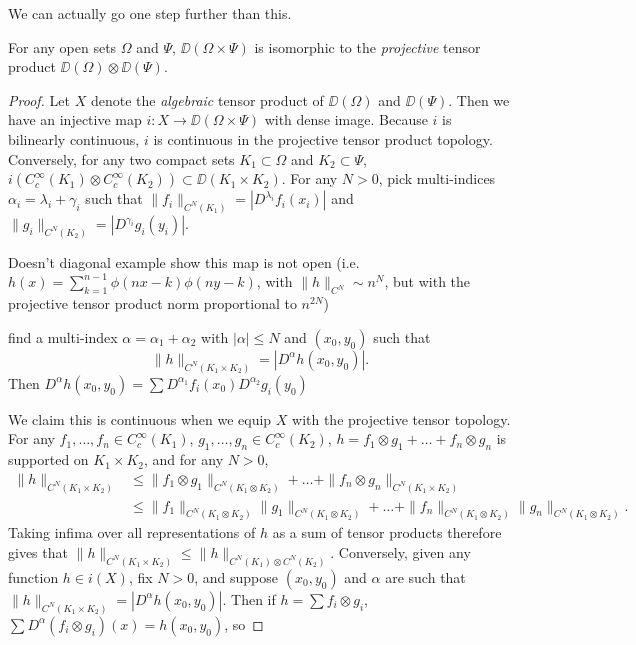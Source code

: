 We can actually go one step further than this.

\begin{theorem}
    For any open sets $\Omega$ and $\Psi$, $\DD(\Omega \times \Psi)$ is isomorphic to the \emph{projective} tensor product $\DD(\Omega) \otimes \DD(\Psi)$.
\end{theorem}
\begin{proof}
    Let $X$ denote the \emph{algebraic} tensor product of $\DD(\Omega)$ and $\DD(\Psi)$. Then we have an injective map $i: X \to \DD(\Omega \times \Psi)$ with dense image. Because $i$ is bilinearly continuous, $i$ is continuous in the projective tensor product topology. Conversely, for any two compact sets $K_1 \subset \Omega$ and $K_2 \subset \Psi$, $i(C_c^\infty(K_1) \otimes C_c^\infty(K_2)) \subset \DD(K_1 \times K_2)$. For any $N > 0$, pick multi-indices $\alpha_i = \lambda_i + \gamma_i$ such that $\| f_i \|_{C^N(K_1)} = |D^{\lambda_i} f_i(x_i)|$ and $\| g_i \|_{C^N(K_2)} = |D^{\gamma_i} g_i(y_i)|$.

    Doesn't diagonal example show this map is not open (i.e. $h(x) = \sum_{k = 1}^{n-1} \phi(nx - k) \phi(ny - k)$, with $\| h \|_{C^N} \sim n^N$, but with the projective tensor product norm proportional to $n^{2N}$)

    find a multi-index $\alpha = \alpha_1 + \alpha_2$ with $|\alpha| \leq N$ and $(x_0,y_0)$ such that
    \[ \| h \|_{C^N(K_1 \times K_2)} = |D^\alpha h(x_0,y_0)|. \]
    Then $D^\alpha h(x_0,y_0) = \sum D^{\alpha_1} f_i(x_0) D^{\alpha_2} g_i(y_0)$



    We claim this is continuous when we equip $X$ with the projective tensor topology. For any $f_1,\dots,f_n \in C_c^\infty(K_1)$, $g_1,\dots,g_n \in C_c^\infty(K_2)$, $h = f_1 \otimes g_1 + \dots + f_n \otimes g_n$ is supported on $K_1 \times K_2$, and for any $N > 0$,
    \begin{align*}
        \| h \|_{C^N(K_1 \times K_2)} &\leq \| f_1 \otimes g_1 \|_{C^N(K_1 \otimes K_2)} + \dots + \| f_n \otimes g_n \|_{C^N(K_1 \times K_2)}\\
        &\leq \| f_1 \|_{C^N(K_1 \otimes K_2)} \| g_1 \|_{C^N(K_1 \otimes K_2)} + \dots + \| f_n \|_{C^N(K_1 \otimes K_2)} \| g_n \|_{C^N(K_1 \otimes K_2)}.
    \end{align*}
    Taking infima over all representations of $h$ as a sum of tensor products therefore gives that $\| h \|_{C^N(K_1 \times K_2)} \leq \| h \|_{C^N(K_1) \otimes C^N(K_2)}$. Conversely, given any function $h \in i(X)$, fix $N > 0$, and suppose $(x_0,y_0)$ and $\alpha$ are such that $\| h \|_{C^N(K_1 \times K_2)} = |D^\alpha h(x_0,y_0)|$. Then if $h = \sum f_i \otimes g_i$, $\sum D^\alpha (f_i \otimes g_i)(x) = h(x_0,y_0)$, so 
\end{proof}

